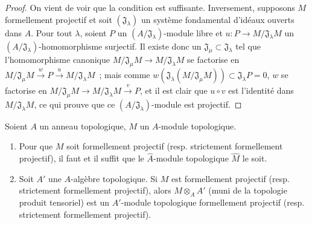 \begin{proof}
On vient de voir que la condition est suffisante. Inversement, supposons $M$
formellement projectif et soit $(\mathfrak J_\lambda)$ un système fondamental
d'idéaux ouverts dans $A$. Pour tout $\lambda$, soient $P$ un
$(A/\mathfrak J_\lambda)$-module libre et
$u:P\to M/\mathfrak J_\lambda M$ un
$(A/\mathfrak J_\lambda)$-homomorphisme surjectif. Il existe donc un
$\mathfrak J_\mu\subset\mathfrak J_\lambda$ tel que l'homomorphisme canonique
$M/\mathfrak J_\mu M\to M/\mathfrak J_\lambda M$ se factorise en
$M/\mathfrak J_\mu M\xrightarrow{w}P\xrightarrow{u}M/\mathfrak J_\lambda M$~;
mais comme
$w(\mathfrak J_\lambda(M/\mathfrak J_\mu M))\subset\mathfrak J_\lambda P=0$,
$w$ se factorise en $M/\mathfrak J_\mu M\to M/\mathfrak J_\lambda M\xrightarrow{v}P$, et il est
clair que $u\circ v$ est l'identité dans $M/\mathfrak J_\lambda M$, ce qui
prouve que ce $(A/\mathfrak J_\lambda)$-module est projectif.
\end{proof}

\begin{proposition}[19.2.5]
\label{0.19.2.5-fr}
Soient $A$ un anneau topologique, $M$ un $A$-module topologique.
\begin{enumerate}
  \item[\textup{(i)}] Pour que $M$ soit formellement projectif \textup{(resp.} strictement
  formellement projectif\textup{)}, il faut et il suffit que le $\hat A$-module
  topologique $\hat M$ le soit.
  \item[\textup{(ii)}] Soit $A'$ une $A$-algèbre topologique. Si $M$ est formellement
  projectif \textup{(resp.} strictement formellement projectif\textup{)}, alors
  $M\otimes_A A'$ (muni de la topologie produit tensoriel) est un $A'$-module
  topologique formellement projectif \textup{(resp.} strictement formellement
  projectif\textup{)}.
\end{enumerate}
\end{proposition}

